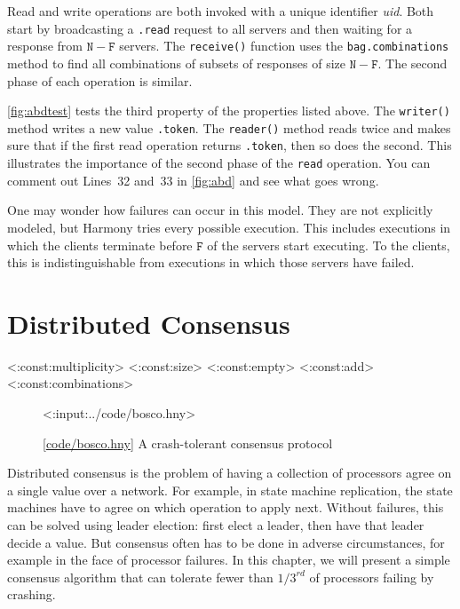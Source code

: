 \documentclass{report}
\newcommand{\harmonylink}[1]{%
[\href{https://harmony.cs.cornell.edu/#1}{\underline{#1}}]%
}
\newenvironment{code}{
\tcolorbox
}{
\endtcolorbox
}
\begin{document}
{Read and write operations are both invoked with a unique identifier
\textit{uid}.  Both start by broadcasting a \texttt{.read}
request to all servers and then waiting for a response from
$\mathtt{N} - \mathtt{F}$ servers.
The \texttt{receive()} function uses the \texttt{bag.combinations} method
to find all combinations of subsets of responses of size
$\mathtt{N} - \mathtt{F}$.
The second phase of each operation is similar.

\autoref{fig:abdtest} tests the third property of the properties listed
above.  The \texttt{writer()} method writes a new value \texttt{.token}.
The \texttt{reader()} method reads twice and makes sure that if the
first read operation returns \texttt{.token}, then so does the second.
This illustrates the importance of the second phase of the \texttt{read}
operation.  You can comment out Lines~32 and~33 in \autoref{fig:abd} and
see what goes wrong.

One may wonder how failures can occur in this model.  They are not
explicitly modeled, but Harmony tries every possible execution.
This includes executions in which the clients terminate before
$\texttt{F}$ of the servers start executing.  To the clients, this
is indistinguishable from executions in which those
servers have failed.

\chapter{Distributed Consensus}
\label{ch:consensus}

<{:const:multiplicity}>
<{:const:size}>
<{:const:empty}>
<{:const:add}>
<{:const:combinations}>

\begin{figure}
\begin{code}
<{:input:../code/bosco.hny}>
\end{code}
\caption{\harmonylink{code/bosco.hny} A crash-tolerant consensus protocol}
\label{fig:bosco}
\end{figure}

Distributed consensus is the problem of having a collection of processors agree
on a single value over a network.
For example, in state machine replication, the state machines have to agree
on which operation to apply next.
Without failures, this can be solved using leader election: first elect a leader, then have that leader decide a value.
But consensus often has to be done in adverse circumstances,
for example in the face of processor failures.
In this chapter, we will present a simple consensus algorithm that can tolerate
fewer than $1/3^{rd}$ of processors failing by crashing.

}
\end{document}
